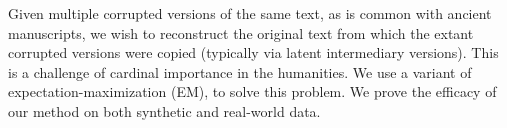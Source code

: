 Given multiple corrupted versions of the same text, as is common with ancient manuscripts, we wish to reconstruct the original text from which the extant corrupted versions were copied (typically via latent intermediary versions). This is a challenge of cardinal importance in the humanities. We use a variant of expectation-maximization (EM), to solve this problem. We prove the efficacy of our method on both synthetic and real-world data.
